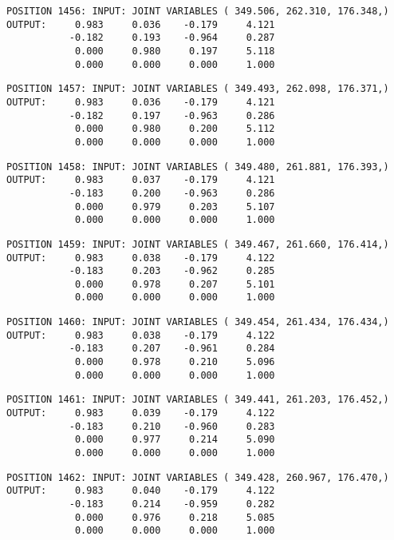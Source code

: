 \begin{verbatim}
POSITION 1456: INPUT: JOINT VARIABLES ( 349.506, 262.310, 176.348,)
OUTPUT:     0.983     0.036    -0.179     4.121
           -0.182     0.193    -0.964     0.287
            0.000     0.980     0.197     5.118
            0.000     0.000     0.000     1.000
\end{verbatim} \pagebreak[1]\begin{verbatim}
POSITION 1457: INPUT: JOINT VARIABLES ( 349.493, 262.098, 176.371,)
OUTPUT:     0.983     0.036    -0.179     4.121
           -0.182     0.197    -0.963     0.286
            0.000     0.980     0.200     5.112
            0.000     0.000     0.000     1.000
\end{verbatim} \pagebreak[1]\begin{verbatim}
POSITION 1458: INPUT: JOINT VARIABLES ( 349.480, 261.881, 176.393,)
OUTPUT:     0.983     0.037    -0.179     4.121
           -0.183     0.200    -0.963     0.286
            0.000     0.979     0.203     5.107
            0.000     0.000     0.000     1.000
\end{verbatim} \pagebreak[1]\begin{verbatim}
POSITION 1459: INPUT: JOINT VARIABLES ( 349.467, 261.660, 176.414,)
OUTPUT:     0.983     0.038    -0.179     4.122
           -0.183     0.203    -0.962     0.285
            0.000     0.978     0.207     5.101
            0.000     0.000     0.000     1.000
\end{verbatim} \pagebreak[1]\begin{verbatim}
POSITION 1460: INPUT: JOINT VARIABLES ( 349.454, 261.434, 176.434,)
OUTPUT:     0.983     0.038    -0.179     4.122
           -0.183     0.207    -0.961     0.284
            0.000     0.978     0.210     5.096
            0.000     0.000     0.000     1.000
\end{verbatim} \pagebreak[1]\begin{verbatim}
POSITION 1461: INPUT: JOINT VARIABLES ( 349.441, 261.203, 176.452,)
OUTPUT:     0.983     0.039    -0.179     4.122
           -0.183     0.210    -0.960     0.283
            0.000     0.977     0.214     5.090
            0.000     0.000     0.000     1.000
\end{verbatim} \pagebreak[1]\begin{verbatim}
POSITION 1462: INPUT: JOINT VARIABLES ( 349.428, 260.967, 176.470,)
OUTPUT:     0.983     0.040    -0.179     4.122
           -0.183     0.214    -0.959     0.282
            0.000     0.976     0.218     5.085
            0.000     0.000     0.000     1.000
\end{verbatim} \pagebreak[1]\begin{verbatim}

\end{verbatim}
